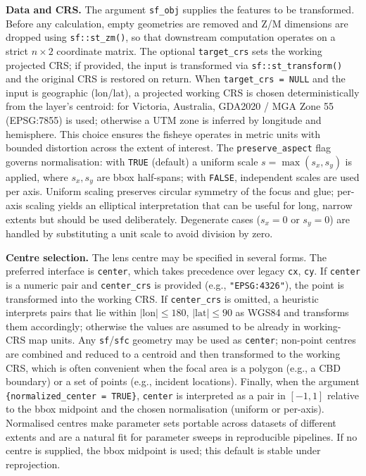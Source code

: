 \textbf{Data and CRS.} The argument \texttt{sf\_obj} supplies the features to be transformed. Before any
calculation, empty geometries are removed and Z/M dimensions are dropped using \texttt{sf::st\_zm()}, so
that downstream computation operates on a strict \(n\times 2\) coordinate matrix. The optional
\texttt{target\_crs} sets the working projected CRS; if provided, the input is transformed via
\texttt{sf::st\_transform()} and the original CRS is restored on return. When \texttt{target\_crs\ =\ NULL}
and the input is geographic (lon/lat), a projected working CRS is chosen deterministically from the
layer's centroid: for Victoria, Australia, GDA2020 / MGA Zone 55 (EPSG:7855) is used; otherwise a
UTM zone is inferred by longitude and hemisphere. This choice ensures the fisheye operates in metric
units with bounded distortion across the extent of interest. The \texttt{preserve\_aspect} flag governs
normalisation: with \texttt{TRUE} (default) a uniform scale \(s = \max(s_x, s_y)\) is applied, where
\(s_x, s_y\) are bbox half-spans; with \texttt{FALSE}, independent scales are used per axis. Uniform
scaling preserves circular symmetry of the focus and glue; per-axis scaling yields an elliptical
interpretation that can be useful for long, narrow extents but should be used deliberately. Degenerate
cases (\(s_x = 0\) or \(s_y = 0\)) are handled by substituting a unit scale to avoid division by zero.

\textbf{Centre selection.} The lens centre may be specified in several forms. The preferred interface
is \texttt{center}, which takes precedence over legacy \texttt{cx}, \texttt{cy}. If \texttt{center} is a
numeric pair and \texttt{center\_crs} is provided (e.g., \texttt{"EPSG:4326"}), the point is transformed
into the working CRS. If \texttt{center\_crs} is omitted, a heuristic interprets pairs that lie within
\(|\text{lon}|\le 180\), \(|\text{lat}|\le 90\) as WGS84 and transforms them accordingly; otherwise
the values are assumed to be already in working-CRS map units. Any \texttt{sf}/\texttt{sfc} geometry may
be used as \texttt{center}; non-point centres are combined and reduced to a centroid and then
transformed to the working CRS, which is often convenient when the focal area is a polygon (e.g., a
CBD boundary) or a set of points (e.g., incident locations). Finally, when the argument \texttt{\{normalized\_center\ =\ TRUE\}}, \texttt{center} is interpreted as a pair in \([-1,1]\) relative to the bbox midpoint and the
chosen normalisation (uniform or per-axis). Normalised centres make parameter sets portable across
datasets of different extents and are a natural fit for parameter sweeps in reproducible pipelines.
If no centre is supplied, the bbox midpoint is used; this default is stable under reprojection.

